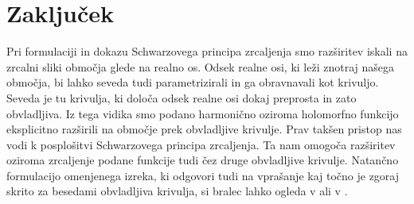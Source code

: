 \documentclass[mat1, tisk]{fmfdelo}
\begin{document}
\section{Zaključek}
    Pri formulaciji in dokazu Schwarzovega principa zrcaljenja smo razširitev iskali na zrcalni sliki območja glede na realno os. 
    Odsek realne osi, ki leži znotraj našega območja, bi lahko seveda tudi parametrizirali in ga obravnavali kot krivuljo. 
    Seveda je tu krivulja, ki določa odsek realne osi dokaj preprosta in zato obvladljiva.
    Iz tega vidika smo podano harmonično oziroma holomorfno funkcijo eksplicitno razširili na območje prek obvladljive krivulje.
    Prav takšen pristop nas vodi k posplošitvi Schwarzovega principa zrcaljenja. 
    Ta nam omogoča razširitev oziroma zrcaljenje podane funkcije tudi čez druge obvladljive krivulje. 
    Natančno formulacijo omenjenega izreka, ki odgovori tudi na vprašanje kaj točno je zgoraj skrito za besedami obvladljiva krivulja, si bralec lahko ogleda v \cite[stran 284, 285 in 286]{gamelin} ali v \cite[stran 102 in 103]{bak_newman}.

    
\end{document}

